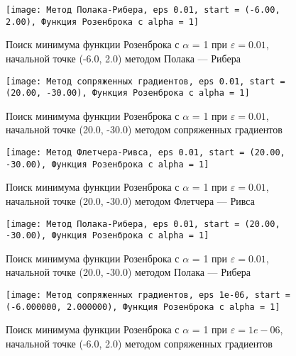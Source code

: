             \begin{figure}[H]
	        \centering
	        \texttt{[image: Метод Полака-Рибера, eps 0.01, start = (-6.00, 2.00), Функция Розенброка с alpha = 1]}%
	        \caption{Поиск минимума функции Розенброка с $\alpha$ = 1 при $\varepsilon = 0.01$, начальной точке (-6.0, 2.0) методом Полака --- Рибера}
	        \vspace*{-1.2cm}
            \end{figure}
            
            \begin{figure}[H]
	        \centering
	        \texttt{[image: Метод сопряженных градиентов, eps 0.01, start = (20.00, -30.00), Функция Розенброка с alpha = 1]}%
	        \caption{Поиск минимума функции Розенброка с $\alpha$ = 1 при $\varepsilon = 0.01$, начальной точке (20.0, -30.0) методом сопряженных градиентов}
	        \vspace*{-1.2cm}
            \end{figure}
            
            \begin{figure}[H]
	        \centering
	        \texttt{[image: Метод Флетчера-Ривса, eps 0.01, start = (20.00, -30.00), Функция Розенброка с alpha = 1]}%
	        \caption{Поиск минимума функции Розенброка с $\alpha$ = 1 при $\varepsilon = 0.01$, начальной точке (20.0, -30.0) методом Флетчера --- Ривса}
	        \vspace*{-1.2cm}
            \end{figure}
            
            \begin{figure}[H]
	        \centering
	        \texttt{[image: Метод Полака-Рибера, eps 0.01, start = (20.00, -30.00), Функция Розенброка с alpha = 1]}%
	        \caption{Поиск минимума функции Розенброка с $\alpha$ = 1 при $\varepsilon = 0.01$, начальной точке (20.0, -30.0) методом Полака --- Рибера}
	        \vspace*{-1.2cm}
            \end{figure}
            
            \begin{figure}[H]
	        \centering
	        \texttt{[image: Метод сопряженных градиентов, eps 1e-06, start = (-6.000000, 2.000000), Функция Розенброка с alpha = 1]}%
	        \caption{Поиск минимума функции Розенброка с $\alpha$ = 1 при $\varepsilon = 1e-06$, начальной точке (-6.0, 2.0) методом сопряженных градиентов}
	        \vspace*{-1.2cm}
            \end{figure}
            
